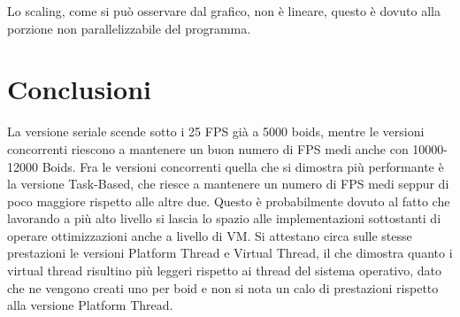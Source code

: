 \documentclass[11pt,notitlepage]{article}
\begin{document}
Lo scaling, come si può osservare dal grafico, non è lineare, questo è dovuto alla porzione non parallelizzabile del programma.

\section{Conclusioni}

La versione seriale scende sotto i 25 FPS già a 5000 boids, mentre le versioni concorrenti riescono a mantenere un buon numero di FPS medi anche con 10000-12000 Boids.
Fra le versioni concorrenti quella che si dimostra più performante è la versione Task-Based, che riesce a mantenere un numero di FPS medi seppur di poco maggiore rispetto alle altre due.
Questo è probabilmente dovuto al fatto che lavorando a più alto livello si lascia lo spazio alle implementazioni sottostanti di operare ottimizzazioni anche a livello di VM.
Si attestano circa sulle stesse prestazioni le versioni Platform Thread e Virtual Thread, il che dimostra quanto i virtual thread risultino più leggeri rispetto ai thread del sistema operativo, dato che ne vengono
creati uno per boid e non si nota un calo di prestazioni rispetto alla versione Platform Thread.
\end{document}
